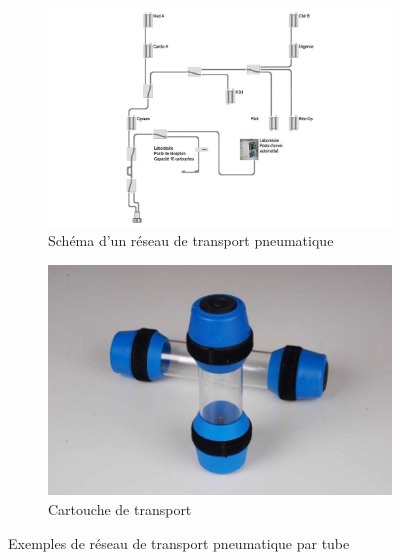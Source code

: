 \begin{figure}[ht]
    \centering
    \begin{subfigure}{0.45\textwidth}
        \centering
        \includegraphics[width=\linewidth]{assets/figures/Hardware/transport_pneu/reseau_pneumatique_hopital.jpg}
        \caption{Schéma d'un réseau de transport pneumatique\footnotemark}
    \end{subfigure}\hfill
    \begin{subfigure}{0.45\textwidth}
        \centering
        \includegraphics[width=\linewidth]{assets/figures/Hardware/transport_pneu/cartouche_transport_pneu.jpg}
        \caption{Cartouche de transport\footnotemark}
    \end{subfigure}
    \caption{Exemples de réseau de transport pneumatique par tube}
\end{figure}
